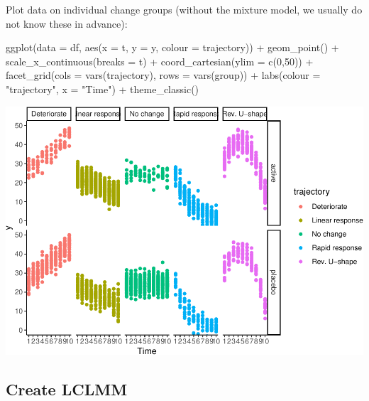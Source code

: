 \documentclass[
]{book}
\newenvironment{Shaded}{\begin{snugshade}}{\end{snugshade}}
\newcommand{\AttributeTok}[1]{\textcolor[rgb]{0.77,0.63,0.00}{#1}}
\newcommand{\DecValTok}[1]{\textcolor[rgb]{0.00,0.00,0.81}{#1}}
\newcommand{\FunctionTok}[1]{\textcolor[rgb]{0.00,0.00,0.00}{#1}}
\newcommand{\NormalTok}[1]{#1}
\newcommand{\SpecialCharTok}[1]{\textcolor[rgb]{0.00,0.00,0.00}{#1}}
\newcommand{\StringTok}[1]{\textcolor[rgb]{0.31,0.60,0.02}{#1}}
\begin{document}
Plot data on individual change groups (without the mixture model, we usually do not know these in advance):

\begin{Shaded}
\begin{Highlighting}[]
\FunctionTok{ggplot}\NormalTok{(}\AttributeTok{data =}\NormalTok{ df, }\FunctionTok{aes}\NormalTok{(}\AttributeTok{x =}\NormalTok{ t, }\AttributeTok{y =}\NormalTok{ y, }\AttributeTok{colour =}\NormalTok{ trajectory)) }\SpecialCharTok{+}
  \FunctionTok{geom\_point}\NormalTok{() }\SpecialCharTok{+}
  \FunctionTok{scale\_x\_continuous}\NormalTok{(}\AttributeTok{breaks =}\NormalTok{ t) }\SpecialCharTok{+}
  \FunctionTok{coord\_cartesian}\NormalTok{(}\AttributeTok{ylim =} \FunctionTok{c}\NormalTok{(}\DecValTok{0}\NormalTok{,}\DecValTok{50}\NormalTok{)) }\SpecialCharTok{+}
  \FunctionTok{facet\_grid}\NormalTok{(}\AttributeTok{cols =} \FunctionTok{vars}\NormalTok{(trajectory), }\AttributeTok{rows =} \FunctionTok{vars}\NormalTok{(group)) }\SpecialCharTok{+}
  \FunctionTok{labs}\NormalTok{(}\AttributeTok{colour =} \StringTok{"trajectory"}\NormalTok{, }\AttributeTok{x =} \StringTok{"Time"}\NormalTok{) }\SpecialCharTok{+}
  \FunctionTok{theme\_classic}\NormalTok{()}
\end{Highlighting}
\end{Shaded}

\includegraphics{DZP_R_bookdown_files/figure-latex/unnamed-chunk-30-1.pdf}

\hypertarget{create-lclmm}{%
\subsection{Create LCLMM}\label{create-lclmm}}
\end{document}
